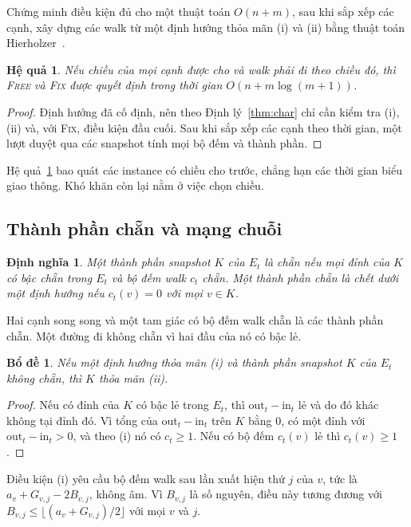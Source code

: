 \documentclass[pdflatex,sn-mathphys-num]{sn-jnl}
\theoremstyle{thmstyleone}%
\newtheorem{lemma}[theorem]{Bổ đề}%
\newtheorem{corollary}[theorem]{Hệ quả}%
\theoremstyle{thmstyletwo}%
\theoremstyle{thmstylethree}%
\newtheorem{definition}{Định nghĩa}%
\newcommand{\out}{\mathrm{out}}
\newcommand{\inn}{\mathrm{in}}
\newcommand{\FIX}{\textup{\textsc{Fix}}}
\newcommand{\FREE}{\textup{\textsc{Free}}}
\newcommand{\floor}[1]{\lfloor #1\rfloor}
\begin{document}
Chứng minh điều kiện đủ cho một thuật toán $O(n+m)$, sau khi sắp xếp các cạnh, xây dựng các walk từ một định hướng thỏa mãn (i) và (ii) bằng thuật toán Hierholzer~\cite{hierholzer1873}.

\begin{corollary}\label{cor:directed}
Nếu chiều của mọi cạnh được cho và walk phải đi theo chiều đó, thì \FREE{} và \FIX{} được quyết định trong thời gian $O(n+m\log(m+1))$.
\end{corollary}

\begin{proof}
Định hướng đã cố định, nên theo Định lý~\ref{thm:char} chỉ cần kiểm tra (i), (ii) và, với \FIX{}, điều kiện đầu cuối. Sau khi sắp xếp các cạnh theo thời gian, một lượt duyệt qua các snapshot tính mọi bộ đếm và thành phần.
\end{proof}

Hệ quả~\ref{cor:directed} bao quát các instance có chiều cho trước, chẳng hạn các thời gian biểu giao thông. Khó khăn còn lại nằm ở việc chọn chiều.

\subsection{Thành phần chẵn và mạng chuỗi}

\begin{definition}\label{def:even}
Một thành phần snapshot $K$ của $E_t$ là \emph{chẵn} nếu mọi đỉnh của $K$ có bậc chẵn trong $E_t$ và bộ đếm walk $c_t$ chẵn. Một thành phần chẵn là \emph{chết} dưới một định hướng nếu $c_t(v)=0$ với mọi $v\in K$.
\end{definition}

Hai cạnh song song và một tam giác có bộ đếm walk chẵn là các thành phần chẵn. Một đường đi không chẵn vì hai đầu của nó có bậc lẻ.

\begin{lemma}\label{lem:noneven}
Nếu một định hướng thỏa mãn (i) và thành phần snapshot $K$ của $E_t$ không chẵn, thì $K$ thỏa mãn (ii).
\end{lemma}

\begin{proof}
Nếu có đỉnh của $K$ có bậc lẻ trong $E_t$, thì $\out_t-\inn_t$ lẻ và do đó khác không tại đỉnh đó. Vì tổng của $\out_t-\inn_t$ trên $K$ bằng $0$, có một đỉnh với $\out_t-\inn_t>0$, và theo (i) nó có $c_t\ge1$. Nếu có bộ đếm $c_t(v)$ lẻ thì $c_t(v)\ge1$.
\end{proof}

Điều kiện (i) yêu cầu bộ đếm walk sau lần xuất hiện thứ $j$ của $v$, tức là $a_v+G_{v,j}-2B_{v,j}$, không âm. Vì $B_{v,j}$ là số nguyên, điều này tương đương với $B_{v,j}\le\floor{(a_v+G_{v,j})/2}$ với mọi $v$ và $j$.
\end{document}
